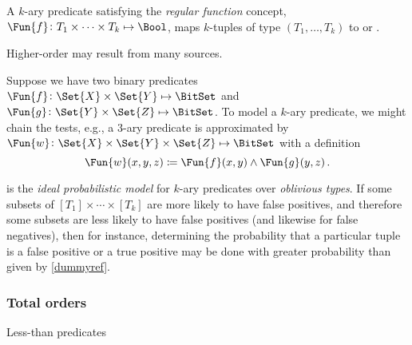 \documentclass[ ../main.tex]{subfiles}
\begin{document}
A $k$-ary predicate satisfying the \emph{regular function} concept, $\Fun{f} \colon T_1 \times \cdots \times T_k \mapsto \Bool$, maps $k$-tuples of type $(T_1,\ldots,T_k)$ to \True or \False.




Higher-order may result from many sources.

Suppose we have two binary predicates $\Fun{f} \colon \Set{X} \times \Set{Y} \mapsto \BitSet$ and $\Fun{g} \colon \Set{Y} \times \Set{Z} \mapsto \BitSet$.
To model a $k$-ary predicate, we might chain the tests, e.g., a $3$-ary predicate is approximated by $\Fun{w} \colon \Set{X} \times \Set{Y} \times \Set{Z} \mapsto \BitSet$ with a definition
\begin{equation}
	\Fun{w}(x,y,z) \coloneqq \Fun{f}(x,y) \land \Fun{g}(y,z)\,.
\end{equation}


 is the \emph{ideal probabilistic model} for $k$-ary predicates over \emph{oblivious types}.
If some subsets of $[T_1] \times \cdots \times [T_k]$ are more likely to have false positives, and therefore some subsets are less likely to have false positives (and likewise for false negatives), then for instance, determining the probability that a particular tuple is a false positive or a true positive may be done with greater probability than given by \cref{dummyref}.

\subsubsection{Total orders}
Less-than predicates
\end{document}
